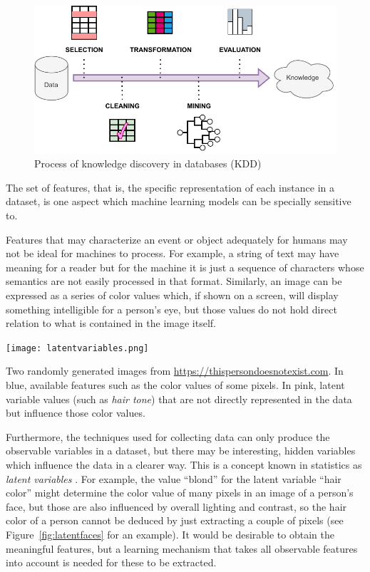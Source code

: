 \begin{figure}
    \includegraphics[width=\linewidth]{images/kddprocess.pdf}
    \caption{Process of knowledge discovery in databases (KDD)}
\end{figure}

The set of features, that is, the specific representation of each instance in a dataset, is one aspect which machine learning models can be specially sensitive to.

Features that may characterize an event or object adequately for humans may not be ideal for machines to process. For example, a string of text may have meaning for a reader but for the machine it is just a sequence of characters whose semantics are not easily processed in that format. Similarly, an image can be expressed as a series of color values which, if shown on a screen, will display something intelligible for a person's eye, but those values do not hold direct relation to what is contained in the image itself.

\begin{marginfigure}
\texttt{[image: latentvariables.png]}
\caption{\label{fig:latentfaces}Two randomly generated images from \url{https://thispersondoesnotexist.com}. In blue, available features such as the color values of some pixels. In pink, latent variable values (such as \textit{hair tone}) that are not directly represented in the data but influence those color values.}
\end{marginfigure}

Furthermore, the techniques used for collecting data can only produce the observable variables in a dataset, but there may be interesting, hidden variables which influence the data in a clearer way. This is a concept known in statistics as \textit{latent variables} . For example, the value  ``blond'' for the latent variable ``hair color'' might determine the color value of many pixels in an image of a person's face, but those are also influenced by overall lighting and contrast, so the hair color of a person cannot be deduced by just extracting a couple of pixels (see Figure~\ref{fig:latentfaces} for an example). It would be desirable to obtain the meaningful features, but a learning mechanism that takes all observable features into account is needed for these to be extracted.

